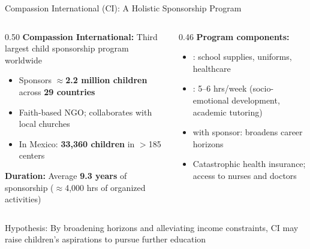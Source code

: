 \documentclass[aspectratio=169, 10pt]{beamer}
\begin{document}
\begin{frame}{Compassion International (CI): A Holistic Sponsorship Program}
  \begin{columns}
    \begin{column}{0.50\textwidth}
      \textbf{Compassion International:} Third largest child sponsorship program worldwide
      \begin{itemize}
        \item Sponsors $\approx$\textbf{2.2 million children} across \textbf{29 countries}
        \item Faith-based NGO; collaborates with local churches
        \item In Mexico: \textbf{33,360 children} in $>$185 centers
      \end{itemize}
      \vspace{0.5em}
      \textbf{Duration:} Average \textbf{9.3 years} of sponsorship ($\approx$4,000 hrs of organized activities)
    \end{column}
    \begin{column}{0.46\textwidth}
      \textbf{Program components:}
      \begin{itemize}
        \item {}: school supplies, uniforms, healthcare
        \item {}: 5--6 hrs/week (socio-emotional development, academic tutoring)
        \item {} with sponsor: broadens career horizons
        \item Catastrophic health insurance; access to nurses and doctors
      \end{itemize}
    \end{column}
  \end{columns}
  \vspace{0.5em}
  \begin{keybox}
    Hypothesis: By broadening horizons and alleviating income constraints, CI may raise children's aspirations to pursue further education
  \end{keybox}
\end{frame}
\end{document}
